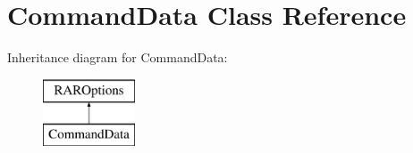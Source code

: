 \hypertarget{class_command_data}{\section{Command\-Data Class Reference}
\label{class_command_data}
}
Inheritance diagram for Command\-Data\-:\begin{figure}[H]
\begin{center}
\leavevmode
\includegraphics[height=2.000000cm]{class_command_data}
\end{center}
\end{figure}
